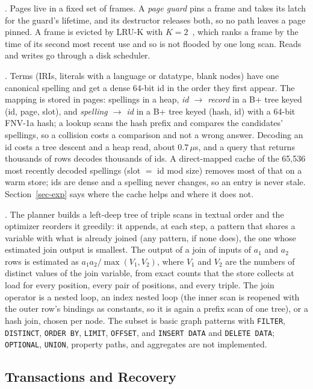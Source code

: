 .
Pages live in a fixed set of frames.
A \emph{page guard} pins a frame and takes its latch for the guard's
lifetime, and its destructor releases both, so no path leaves a page pinned.
A frame is evicted by LRU-K with $K{=}2$~\cite{oneil1993}, which ranks a
frame by the time of its second most recent use and so is not flooded by one
long scan.
Reads and writes go through a disk scheduler.

.
Terms (IRIs, literals with a language or datatype, blank nodes) have one
canonical spelling and get a dense 64-bit id in the order they first appear.
The mapping is stored in pages: spellings in a heap, \emph{id $\to$ record}
in a B+ tree keyed (id, page, slot), and \emph{spelling $\to$ id} in a B+
tree keyed (hash, id) with a 64-bit FNV-1a hash; a lookup scans the hash
prefix and compares the candidates' spellings, so a collision costs a
comparison and not a wrong answer.
Decoding an id costs a tree descent and a heap read, about $0.7\,\mu$s, and
a query that returns thousands of rows decodes thousands of ids.
A direct-mapped cache of the 65,536 most recently decoded spellings (slot
$=$ id mod size) removes most of that on a warm store; ids are dense and a
spelling never changes, so an entry is never stale.
Section~\ref{sec-exp} says where the cache helps and where it does not.

.
The planner builds a left-deep tree of triple scans in textual order and the
optimizer reorders it greedily: it appends, at each step, a pattern that
shares a variable with what is already joined (any pattern, if none does),
the one whose estimated join output is smallest.
The output of a join of inputs of $a_1$ and $a_2$ rows is estimated as
$a_1a_2/\max(V_1,V_2)$, where $V_1$ and $V_2$ are the numbers of distinct values
of the join variable, from exact counts that the store
collects at load for every position, every pair of positions, and every
triple.
The join operator is a nested loop, an index nested loop (the inner scan is
reopened with the outer row's bindings as constants, so it is again a prefix
scan of one tree), or a hash join, chosen per node.
The \sparql subset is basic graph patterns with \texttt{FILTER},
\texttt{DISTINCT}, \texttt{ORDER BY}, \texttt{LIMIT}, \texttt{OFFSET}, and
\texttt{INSERT DATA} and \texttt{DELETE DATA}; \texttt{OPTIONAL},
\texttt{UNION}, property paths, and aggregates are not implemented.

\subsection{Transactions and Recovery}
\label{sec-store-log}

